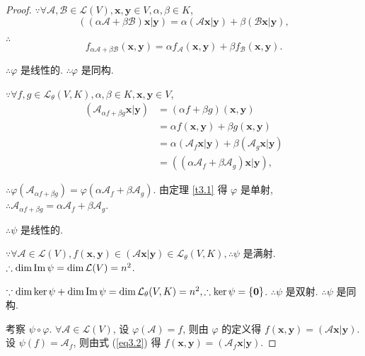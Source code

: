 \documentclass{ctexart}
\begin{document}
\begin{proof}
    $\because\forall\mathcal{A},\mathcal{B}\in\mathcal{L}(V),\boldsymbol{x},\boldsymbol{y}\in V,\alpha,\beta\in K$,
    \[((\alpha\mathcal{A}+\beta\mathcal{B})\boldsymbol{x}|\boldsymbol{y})=\alpha(\mathcal{A}\boldsymbol{x}|\boldsymbol{y})+\beta(\mathcal{B}\boldsymbol{x}|\boldsymbol{y}),\]
    
    $\therefore$
    \[f_{\alpha\mathcal{A}+\beta\mathcal{B}}(\boldsymbol{x},\boldsymbol{y})=\alpha f_{\mathcal{A}}(\boldsymbol{x},\boldsymbol{y})+\beta f_{\mathcal{B}}(\boldsymbol{x},\boldsymbol{y}).\]

    $\therefore\varphi$ 是线性的. $\therefore\varphi$ 是同构.

    $\because\forall f,g\in\mathcal{L}_\theta(V,K),\alpha,\beta\in K,\boldsymbol{x},\boldsymbol{y}\in V$,
    \begin{align*}
        (\mathcal{A}_{\alpha f+\beta g}\boldsymbol{x}|\boldsymbol{y}) & =(\alpha f+\beta g)(\boldsymbol{x},\boldsymbol{y}) \\
        & =\alpha f(\boldsymbol{x},\boldsymbol{y})+\beta g(\boldsymbol{x},\boldsymbol{y}) \\
        & =\alpha(\mathcal{A}_f\boldsymbol{x}|\boldsymbol{y})+\beta(\mathcal{A}_g\boldsymbol{x}|\boldsymbol{y}) \\
        & =((\alpha\mathcal{A}_f+\beta\mathcal{A}_g)\boldsymbol{x}|\boldsymbol{y}),
    \end{align*}

    $\therefore\varphi(\mathcal{A}_{\alpha f+\beta g})=\varphi(\alpha\mathcal{A}_f+\beta\mathcal{A}_g)$. 由定理 \ref{t3.1} 得 $\varphi$ 是单射, $\therefore\mathcal{A}_{\alpha f+\beta g}=\alpha\mathcal{A}_f+\beta\mathcal{A}_g$.

    $\therefore\psi$ 是线性的.

    $\because\forall\mathcal{A}\in\mathcal{L}(V),f(\boldsymbol{x},\boldsymbol{y})\in(\mathcal{A}\boldsymbol{x}|\boldsymbol{y})\in\mathcal{L}_\theta(V,K),\therefore\psi$ 是满射. $\therefore\dim\operatorname{Im} \psi=\dim\mathcal{L}(V)=n^2$.

    $\because\dim\ker\psi+\dim\operatorname{Im} \psi=\dim\mathcal{L}_\theta(V,K)=n^2,\therefore\ker\psi=\{\boldsymbol{0}\}$. $\therefore\psi$ 是双射. $\therefore\psi$ 是同构.

    考察 $\psi\circ\varphi$. $\forall\mathcal{A}\in\mathcal{L}(V)$, 设 $\varphi(\mathcal{A})=f$, 则由 $\varphi$ 的定义得 $f(\boldsymbol{x},\boldsymbol{y})=(\mathcal{A}\boldsymbol{x}|\boldsymbol{y})$. 设 $\psi(f)=\mathcal{A}_f$, 则由式 (\ref{eq3.2}) 得 $f(\boldsymbol{x},\boldsymbol{y})=(\mathcal{A}_f\boldsymbol{x}|\boldsymbol{y})$.
    

\end{proof}
\end{document}

